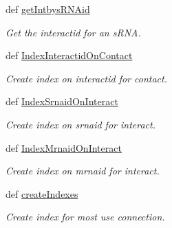 \begin{DoxyCompactItemize}
def \hyperlink{classirna_1_1David2tulip_1_1Sqlite__manager_1_1Sqlite__manager_a25038758630928ff335dd7a2d20a45f2}{get\-Intbys\-R\-N\-Aid}
\begin{DoxyCompactList}\small\item\em \-Get the interactid for an s\-R\-N\-A. \end{DoxyCompactList}\item 
def \hyperlink{classirna_1_1David2tulip_1_1Sqlite__manager_1_1Sqlite__manager_a6454b3049506d7e68e71dceb48052994}{\-Index\-Interactid\-On\-Contact}
\begin{DoxyCompactList}\small\item\em \-Create index on interactid for contact. \end{DoxyCompactList}\item 
def \hyperlink{classirna_1_1David2tulip_1_1Sqlite__manager_1_1Sqlite__manager_aa3d6b1567287f403da6d393aac1f9ef5}{\-Index\-Srnaid\-On\-Interact}
\begin{DoxyCompactList}\small\item\em \-Create index on srnaid for interact. \end{DoxyCompactList}\item 
def \hyperlink{classirna_1_1David2tulip_1_1Sqlite__manager_1_1Sqlite__manager_a427422307209198a389729f4bcb62a45}{\-Index\-Mrnaid\-On\-Interact}
\begin{DoxyCompactList}\small\item\em \-Create index on mrnaid for interact. \end{DoxyCompactList}\item 
def \hyperlink{classirna_1_1David2tulip_1_1Sqlite__manager_1_1Sqlite__manager_a1945978b9c2dd3673d986b50a7111ed6}{create\-Indexes}
\begin{DoxyCompactList}\small\item\em \-Create index for most use connection. \end{DoxyCompactList}\end{DoxyCompactItemize}
